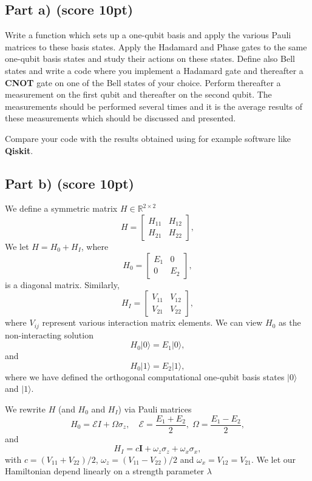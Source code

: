 \documentclass[%
oneside,                 %
final,                   %
10pt]{article}
\begin{document}
\subsection{Part a) (score 10pt)}

Write a function which sets up a one-qubit basis and apply the various
Pauli matrices to these basis states.  Apply the Hadamard and Phase
gates to the same one-qubit basis states and study their actions on
these states. Define also Bell states and write a code where you
implement a Hadamard gate and thereafter a \textbf{CNOT} gate on one of the Bell
states of your choice. Perform thereafter a measurement on the first qubit and
thereafter on the second qubit. The measurements should be performed 
several times and it is the average results of these measurements
which should be discussed and presented.

Compare your code with the results obtained using for example software like \textbf{Qiskit}.

\subsection{Part b) (score 10pt)}

We define a  symmetric matrix  $H\in {\mathbb{R}}^{2\times 2}$
\[
H = \begin{bmatrix} H_{11} & H_{12} \\ H_{21} & H_{22}
\end{bmatrix},
\]
We  let $H = H_0 + H_I$, where
\[
H_0= \begin{bmatrix} E_1 & 0 \\ 0 & E_2\end{bmatrix},
\]
is a diagonal matrix. Similarly,
\[
H_I= \begin{bmatrix} V_{11} & V_{12} \\ V_{21} & V_{22}\end{bmatrix},
\]
where $V_{ij}$ represent various interaction matrix elements.
We can view $H_0$ as the non-interacting solution
\begin{equation}
       H_0\vert 0 \rangle =E_1\vert 0 \rangle,
\end{equation}
and
\begin{equation}
       H_0\vert 1\rangle =E_2\vert 1\rangle,
\end{equation}
where we have defined the orthogonal computational one-qubit basis states $\vert 0\rangle$ and $\vert 1\rangle$.

We rewrite $H$ (and $H_0$ and $H_I$)  via Pauli matrices
\[
H_0 = \mathcal{E} I + \Omega \sigma_z, \quad \mathcal{E} = \frac{E_1
  + E_2}{2}, \; \Omega = \frac{E_1-E_2}{2},
\]
and
\[
H_I = c \bm{I} +\omega_z\sigma_z + \omega_x\sigma_x,
\]
with $c = (V_{11}+V_{22})/2$, $\omega_z = (V_{11}-V_{22})/2$ and $\omega_x = V_{12}=V_{21}$.
We let our Hamiltonian depend linearly on a strength parameter $\lambda$
\end{document}
